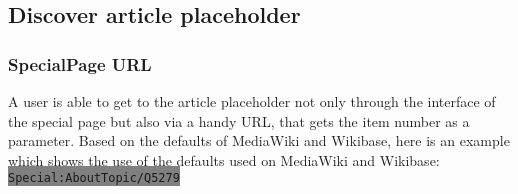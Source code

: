 \documentclass[11pt]{article}
\begin{document}
\subsection{Discover article placeholder}
\subsubsection{SpecialPage URL}
A user is able to get to the article placeholder not only through the interface of the special page but also via a handy URL, that gets the item number as a parameter. Based on the defaults of MediaWiki and Wikibase, here is an example which shows the use of the defaults used on MediaWiki and Wikibase: \colorbox{Gray}{\lstinline[basicstyle=\ttfamily\color{white}]|Special:AboutTopic/Q5279|} \\
\end{document}
